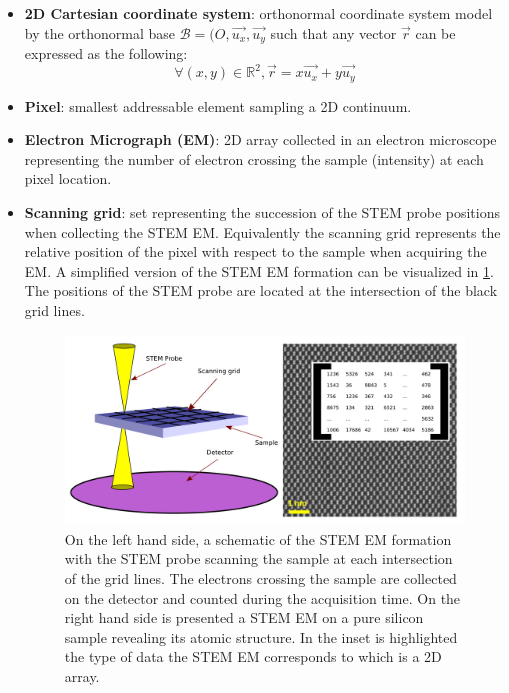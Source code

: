 \documentclass[12pt]{article}
\begin{document}
\begin{itemize}

\item \textbf{2D Cartesian coordinate system}: orthonormal coordinate system model by the orthonormal base $\mathcal{B}=(O,\vec{u_x},\vec{u_y}$ such that any vector $\vec{r}$ can be expressed as the following:
\begin{equation}
\forall (x,y) \in \mathbb{R}^{2}, \vec{r}=x\vec{u_x}+y\vec{u_y}
\end{equation}
\item \textbf{Pixel}: smallest addressable element sampling a 2D continuum.
\item \textbf{Electron Micrograph (EM)}: 2D array collected in an electron microscope 
representing the number of electron crossing the sample (intensity) at each 
pixel location.
\item \textbf{Scanning grid}: set representing the succession of the STEM probe positions when collecting the STEM EM. Equivalently the scanning grid represents the relative position of the pixel with respect to the sample when acquiring the EM. A simplified version of the 
STEM EM formation can be visualized in \cref{fig:STEM_imaging_Fig}. The positions of the STEM probe are located at the intersection of the black grid lines.
\begin{figure}[H]
\includegraphics[width=\linewidth]{Figures/STEM_imaging_Fig.png}
\caption{On the left hand side, a schematic of the STEM EM formation with the STEM probe scanning the sample at each intersection of the grid lines. The electrons crossing the sample are collected on the detector and counted during the acquisition time. On the right hand side is presented a STEM EM on a pure silicon sample revealing its atomic structure. In the inset is highlighted the type of data the STEM EM corresponds to which is a 2D array.}
\label{fig:STEM_imaging_Fig}
\end{figure}

\end{itemize}
\end{document}

